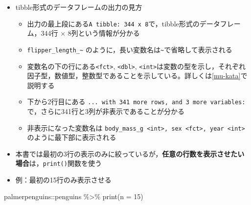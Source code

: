 \documentclass[
  xelatex,ja=standard, b5paper]{bxjsbook}
\newenvironment{Shaded}{\begin{snugshade}}{\end{snugshade}}
\newcommand{\AttributeTok}[1]{\textcolor[rgb]{0.77,0.63,0.00}{#1}}
\newcommand{\DecValTok}[1]{\textcolor[rgb]{0.00,0.00,0.81}{#1}}
\newcommand{\FunctionTok}[1]{\textcolor[rgb]{0.00,0.00,0.00}{#1}}
\newcommand{\NormalTok}[1]{#1}
\newcommand{\SpecialCharTok}[1]{\textcolor[rgb]{0.00,0.00,0.00}{#1}}
\providecommand{\tightlist}{%
  \setlength{\itemsep}{0pt}\setlength{\parskip}{0pt}}
\begin{document}
\begin{itemize}
\tightlist
\item
  tibble形式のデータフレームの出力の見方

  \begin{itemize}
  \tightlist
  \item
    出力の最上段にある\texttt{A\ tibble:\ 344\ x\ 8}で，tibble形式のデータフレーム，344行 × 8列という情報が分かる
  \item
    \texttt{flipper\_length\_\textasciitilde{}} のように，長い変数名は\texttt{\textasciitilde{}}で省略して表示される
  \item
    変数名の下の行にある\texttt{\textless{}fct\textgreater{}}, \texttt{\textless{}dbl\textgreater{}}, \texttt{\textless{}int\textgreater{}}は変数の型を示し，それぞれ因子型，数値型，整数型であることを示している。詳しくは\ref{mu-kata}で説明する
  \item
    下から2行目にある
    \texttt{...\ with\ 341\ more\ rows,\ and\ 3\ more\ variables:}
    で，さらに341行と3列が非表示であることが分かる
  \item
    非表示になった変数名は
    \texttt{body\_mass\_g\ \textless{}int\textgreater{},\ sex\ \textless{}fct\textgreater{},\ year\ \textless{}int\textgreater{}}
    のように最下部に表示される
  \end{itemize}
\item
  本書では最初の3行の表示のみに絞っているが，\textbf{任意の行数を表示させたい場合}は，\texttt{print()}関数を使う
\item
  例：最初の15行のみ表示させる
\end{itemize}

\begin{Shaded}
\begin{Highlighting}[]
\NormalTok{palmerpenguins}\SpecialCharTok{::}\NormalTok{penguins }\SpecialCharTok{\%\textgreater{}\%} 
  \FunctionTok{print}\NormalTok{(}\AttributeTok{n =} \DecValTok{15}\NormalTok{)}
\end{Highlighting}
\end{Shaded}
\end{document}

